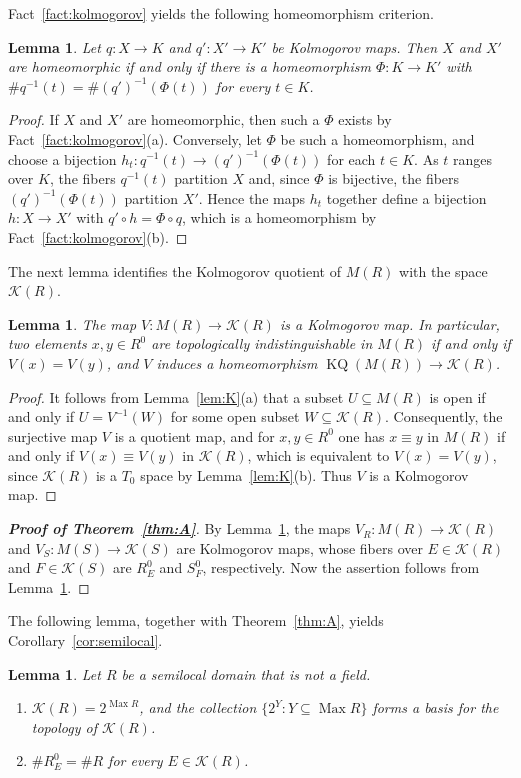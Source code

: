 \documentclass[12pt,reqno,a4paper]{amsart}
\newcommand{\K}{\mathcal{K}}
\DeclareMathOperator{\Max}{Max}
\theoremstyle{plain}
\newtheorem{lemma}[theorem]{Lemma}
\theoremstyle{definition}
\begin{document}
   Fact~\ref{fact:kolmogorov} yields the following homeomorphism criterion.
\begin{lemma}\label{property:kolmogorov}
Let $q\colon X\to K$ and $q'\colon X'\to K'$ be Kolmogorov maps. Then $X$ and $X'$ are homeomorphic if and only if there is a homeomorphism $\Phi\colon K\to K'$ with $\#q^{-1}(t)=\#(q')^{-1}(\Phi(t))$ for every $t\in K$.
\end{lemma}
\begin{proof}
If $X$ and $X'$ are homeomorphic, then such a $\Phi$ exists by Fact~\ref{fact:kolmogorov}(a). Conversely, let $\Phi$ be such a homeomorphism, and choose a bijection $h_t\colon q^{-1}(t)\to (q')^{-1}(\Phi(t))$ for each $t\in K$. As $t$ ranges over $K$, the fibers $q^{-1}(t)$ partition $X$ and, since $\Phi$ is bijective, the fibers $(q')^{-1}(\Phi(t))$ partition $X'$. Hence the maps $h_t$ together define a bijection $h\colon X\to X'$ with $q'\circ h=\Phi\circ q$, which is a homeomorphism by Fact~\ref{fact:kolmogorov}(b).
\end{proof}
The next lemma identifies the Kolmogorov quotient of $M(R)$ with the space $\K(R)$.
\begin{lemma}\label{lem:indist}
The map $V\colon M(R)\to\K(R)$ is a Kolmogorov map. In particular, two elements $x,y\in R^0$ are topologically indistinguishable in $M(R)$ if and only if $V(x)=V(y)$, and $V$ induces a homeomorphism $\operatorname{KQ}(M(R))\to\K(R)$.
\end{lemma}
\begin{proof}
It follows from Lemma~\ref{lem:K}(a) that a subset $U\subseteq M(R)$ is open if and only if $U=V^{-1}(W)$ for some open subset $W\subseteq\K(R)$. Consequently, the surjective map $V$ is a quotient map, and for $x,y\in R^0$ one has $x\equiv y$ in $M(R)$ if and only if $V(x)\equiv V(y)$ in $\K(R)$, which is equivalent to $V(x)=V(y)$, since $\K(R)$ is a $T_0$ space by Lemma~\ref{lem:K}(b). Thus $V$ is a Kolmogorov map.
\end{proof}
\begin{proof}[\normalfont\bfseries Proof of Theorem~\ref{thm:A}]
By Lemma~\ref{lem:indist}, the maps $V_R\colon M(R)\to\K(R)$ and $V_S\colon M(S)\to\K(S)$ are Kolmogorov maps, whose fibers over $E\in\K(R)$ and $F\in\K(S)$ are $R^0_E$ and $S^0_F$, respectively. Now the assertion follows from Lemma~\ref{property:kolmogorov}.
\end{proof}
The following lemma, together with Theorem~\ref{thm:A}, yields Corollary~\ref{cor:semilocal}.
\begin{lemma}\label{lem:semilocal}
Let $R$ be a semilocal domain that is not a field.
\begin{enumerate}[label=\textup{(\alph*)}]
\item $\K(R)=2^{\Max R}$, and the collection $\{2^Y:Y\subseteq\Max R\}$ forms a basis for the topology of $\K(R)$.
\item $\#R^0_E=\#R$ for every $E\in\K(R)$.
\end{enumerate}
\end{lemma}
\end{document}
